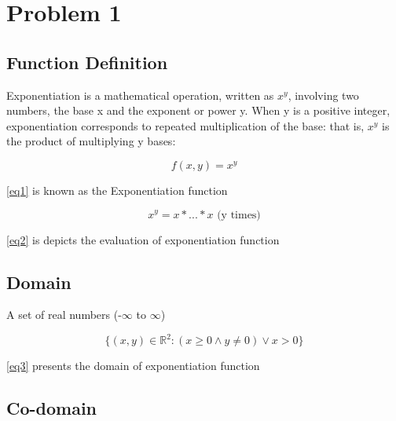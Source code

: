 \documentclass[11pt, english]{report}
\newcommand{\R}{\mathbb{R}}
\begin{document}
\newcommand{\CC}{C\nolinebreak\hspace{-.05em}\raisebox{.4ex}{\tiny\bf +}\nolinebreak\hspace{-.10em}\raisebox{.4ex}{\tiny\bf +}}
\def\CC{{C\nolinebreak[4]\hspace{-.05em}\raisebox{.4ex}{\tiny\bf ++}}}

\tableofcontents
\newpage
\chapter{Problem 1}

\section{Function Definition}

Exponentiation\cite{wiki} is a mathematical operation, written as \(x^y\), involving two numbers, the base x and the exponent or power y. When y is a positive integer, exponentiation corresponds to repeated multiplication of the base: that is, \(x^y\) is the product of multiplying y bases:

\begin{equation} \label{eq1}
f(x,y)= x^y
\end{equation}
 
\ref{eq1} is known as the Exponentiation function

\begin{equation} \label{eq2}
x^y= x*...*x \textrm{ (y times)}
\end{equation}
 
\ref{eq2} is depicts the evaluation of exponentiation function

\section{Domain}

A set of real numbers\cite{wolframalpha}  (-\(\infty\) to \(\infty\))

\begin{equation} \label{eq3}
\{(x,y) \in \R^2 : (x \geq 0 \land y \neq 0) \lor x>0\}
\end{equation}
 
\ref{eq3} presents the domain of exponentiation function

\section{Co-domain}
\end{document}
